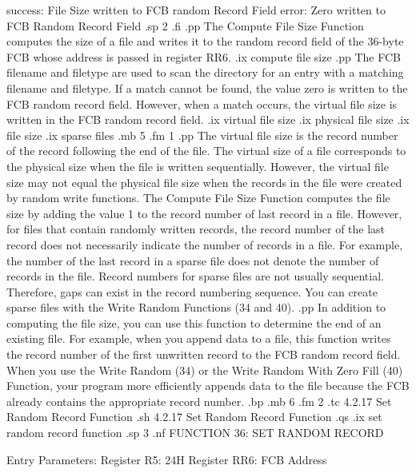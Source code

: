                             success:  File Size written
                                      to FCB random 
                                      Record Field
                              error:  Zero written to
                                      FCB Random Record
                                      Field
.sp 2
.fi
.pp
The Compute File Size Function computes the size of a file and writes
it to the random record field of the 36-byte FCB whose address is passed in  
register  RR6. 
.ix compute file size
.pp
The FCB filename and filetype are used to scan the directory for
an entry with a matching filename and filetype. If a match cannot be found,
the value zero is written to the FCB random record field. However, when a match
occurs, the virtual file size is written in the FCB random
record field. 
.ix virtual file size
.ix physical file size
.ix file size
.ix sparse files
.mb 5
.fm 1
.pp
The virtual file size is the record number of the
record following the end of the file. The virtual size of a file
corresponds to the physical size when the file is written
sequentially.  However, the virtual file size may not equal the
physical file size when the records in the file were created by
random write functions. The Compute File Size Function computes
the file size by adding the value 1 to the record number of last
record in a file.  However, for files that contain randomly
written records, the record number of the last record does not
necessarily indicate the number of records in a file.  For
example, the number of the last record in a sparse file does not
denote the number of records in the file. Record numbers for 
sparse files are not usually sequential.  Therefore, gaps can exist
in the record numbering sequence.   You can create sparse files with
the Write Random Functions (34 and 40).
.pp
In addition to computing the file size, you can use this function to
determine the end of an existing file.  For example, when you append data
to a file, this function writes the record number of the first unwritten
record to the FCB random record field. When you use the Write Random (34)
or the Write Random With Zero Fill (40) Function, your program more
efficiently appends data to the file because the FCB already contains the
appropriate record number. 
.bp
.mb 6
.fm 2
.tc         4.2.17  Set Random Record Function
.sh 
4.2.17 Set Random Record Function
.qs
.ix set random record function
.sp 3
.nf
                 FUNCTION 36:  SET RANDOM RECORD

                Entry Parameters:
                   Register   R5:  24H
                   Register  RR6:  FCB Address


